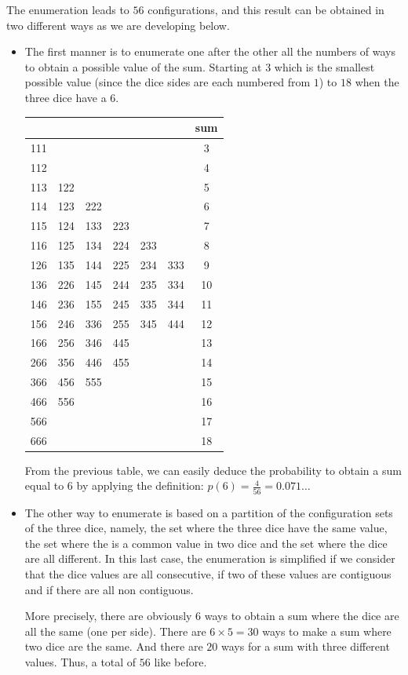 The enumeration leads to $56$ configurations, and this result can be obtained in two different ways
as we are developing below.
\begin{itemize}
\item 
The first manner is to enumerate one after the other all the numbers of ways to obtain a possible value of the sum.
Starting at $3$ which is the smallest possible value (since the dice sides are each numbered from $1$) to $18$
when the three dice have a $6$.

\begin{tabular}{|c|c|c|c|c|c|c|}
\hline
 & & & & & & sum\\
\hline
111 & & & & & & 3\\
112 & & & & & & 4\\
113 & 122 & & & & & 5 \\
114 & 123 & 222 & & & & 6 \\
115 & 124 & 133 & 223 & & & 7\\
116 & 125 & 134 &  224 & 233 & & 8\\
126 & 135 & 144 & 225 & 234 & 333 & 9\\
136 &  226 & 145 & 244 & 235 & 334 & 10\\
146 & 236 & 155 & 245 & 335 & 344 & 11\\
156 & 246 & 336 & 255 & 345 & 444 & 12\\
166 & 256 & 346 & 445 & & & 13\\
266 & 356 & 446 & 455 & & & 14\\
366 & 456 & 555 & & & & 15\\
466 & 556 & & & & & 16\\
566 & & & & & & 17\\
666 & & & & & & 18\\
\hline
\end{tabular}
\smallskip

From the previous table, we can easily deduce the probability to obtain a sum equal to 6
by applying the definition: $p(6) = \frac{4}{56}=0.071\ldots$
\item 
The other way to enumerate is based on 
a partition of the configuration sets of the three dice, namely,
the set where the three dice have the same value, the set where the is a common value in two dice
and the set where the dice are all different. 
In this last case, the enumeration is simplified if we consider that the dice values are all consecutive,
if two of these values are contiguous and if there are all non contiguous.

More precisely, there are obviously $6$ ways to obtain a sum where the dice are all the same (one per side).
There are $6 \times 5 = 30$ ways to make a sum where two dice are the same. 
And there are $20$ ways for a sum with three different values. 
Thus, a total of $56$ like before.
\end{itemize}

